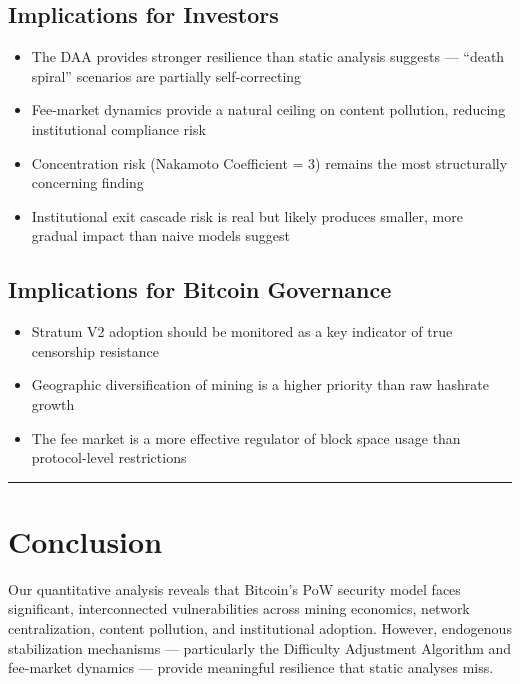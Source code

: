 \documentclass[
  11pt,
]{article}
\providecommand{\tightlist}{%
  \setlength{\itemsep}{0pt}\setlength{\parskip}{0pt}}\usepackage{longtable,booktabs,array}
\let\oldsection\section
\renewcommand{\section}[1]{\FloatBarrier\oldsection{#1}}
\let\oldsubsection\subsection
\renewcommand{\subsection}[1]{\FloatBarrier\oldsubsection{#1}}
\begin{document}
\hypertarget{implications-for-investors}{%
\subsection{Implications for
Investors}\label{implications-for-investors}}

\begin{itemize}
\tightlist
\item
  The DAA provides stronger resilience than static analysis suggests ---
  ``death spiral'' scenarios are partially self-correcting
\item
  Fee-market dynamics provide a natural ceiling on content pollution,
  reducing institutional compliance risk
\item
  Concentration risk (Nakamoto Coefficient = 3) remains the most
  structurally concerning finding
\item
  Institutional exit cascade risk is real but likely produces smaller,
  more gradual impact than naive models suggest
\end{itemize}

\hypertarget{implications-for-bitcoin-governance}{%
\subsection{Implications for Bitcoin
Governance}\label{implications-for-bitcoin-governance}}

\begin{itemize}
\tightlist
\item
  Stratum V2 adoption should be monitored as a key indicator of true
  censorship resistance
\item
  Geographic diversification of mining is a higher priority than raw
  hashrate growth
\item
  The fee market is a more effective regulator of block space usage than
  protocol-level restrictions
\end{itemize}

\begin{center}\rule{0.5\linewidth}{0.5pt}\end{center}

\hypertarget{conclusion}{%
\section{Conclusion}\label{conclusion}}

Our quantitative analysis reveals that Bitcoin's PoW security model
faces significant, interconnected vulnerabilities across mining
economics, network centralization, content pollution, and institutional
adoption. However, endogenous stabilization mechanisms --- particularly
the Difficulty Adjustment Algorithm and fee-market dynamics --- provide
meaningful resilience that static analyses miss.
\end{document}
